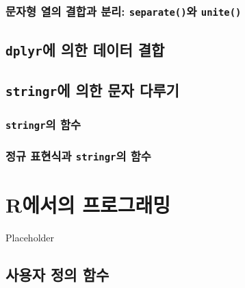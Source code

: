 \documentclass[
]{book}
\begin{document}
\hypertarget{uxbb38uxc790uxd615-uxc5f4uxc758-uxacb0uxd569uxacfc-uxbd84uxb9ac-separateuxc640-unite}{%
\subsection{\texorpdfstring{문자형 열의 결합과 분리: \texttt{separate()}와 \texttt{unite()}}{문자형 열의 결합과 분리: separate()와 unite()}}\label{uxbb38uxc790uxd615-uxc5f4uxc758-uxacb0uxd569uxacfc-uxbd84uxb9ac-separateuxc640-unite}}

\hypertarget{dplyruxc5d0-uxc758uxd55c-uxb370uxc774uxd130-uxacb0uxd569}{%
\section{\texorpdfstring{\texttt{dplyr}에 의한 데이터 결합}{dplyr에 의한 데이터 결합}}\label{dplyruxc5d0-uxc758uxd55c-uxb370uxc774uxd130-uxacb0uxd569}}

\hypertarget{stringruxc5d0-uxc758uxd55c-uxbb38uxc790-uxb2e4uxb8e8uxae30}{%
\section{\texorpdfstring{\texttt{stringr}에 의한 문자 다루기}{stringr에 의한 문자 다루기}}\label{stringruxc5d0-uxc758uxd55c-uxbb38uxc790-uxb2e4uxb8e8uxae30}}

\hypertarget{stringruxc758-uxd568uxc218}{%
\subsection{\texorpdfstring{\texttt{stringr}의 함수}{stringr의 함수}}\label{stringruxc758-uxd568uxc218}}

\hypertarget{uxc815uxaddc-uxd45cuxd604uxc2dduxacfc-stringruxc758-uxd568uxc218}{%
\subsection{\texorpdfstring{정규 표현식과 \texttt{stringr}의 함수}{정규 표현식과 stringr의 함수}}\label{uxc815uxaddc-uxd45cuxd604uxc2dduxacfc-stringruxc758-uxd568uxc218}}

\hypertarget{chapter-programming}{%
\chapter{R에서의 프로그래밍}\label{chapter-programming}}

Placeholder

\hypertarget{uxc0acuxc6a9uxc790-uxc815uxc758-uxd568uxc218}{%
\section{사용자 정의 함수}\label{uxc0acuxc6a9uxc790-uxc815uxc758-uxd568uxc218}}
\end{document}

